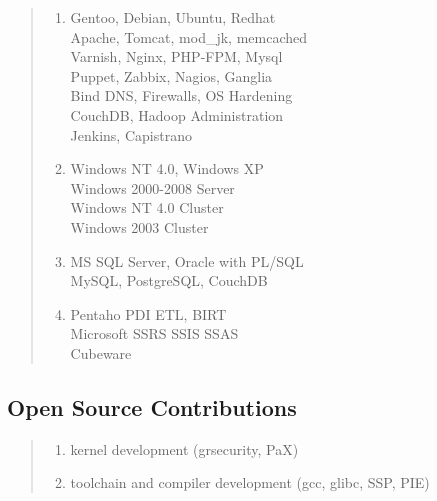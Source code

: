 \documentclass[a4paper]{report}
\begin{document}
\begin{quote}

\begin{enumerate}

\item[\textbf{Linux}]
                  Gentoo, Debian, Ubuntu, Redhat\\
                  Apache, Tomcat, mod\_jk, memcached\\
                  Varnish, Nginx, PHP-FPM, Mysql\\
                  Puppet, Zabbix, Nagios, Ganglia\\
                  Bind DNS, Firewalls, OS Hardening\\
                  CouchDB, Hadoop Administration\\
                  Jenkins, Capistrano

\item[\textbf{Microsoft}]
                  Windows NT 4.0, Windows XP\\
                  Windows 2000-2008 Server\\
                  Windows NT 4.0 Cluster\\
                  Windows 2003 Cluster

\item[\textbf{Databases}]
                  MS SQL Server, Oracle with PL/SQL\\
                  MySQL, PostgreSQL, CouchDB

\item[\textbf{BI}]
                  Pentaho PDI ETL, BIRT\\
                  Microsoft SSRS SSIS SSAS\\
                  Cubeware

\end{enumerate}

\end{quote}

\subsection*{Open Source Contributions}

\begin{quote}

\begin{enumerate}
\item[Parisc-Linux]    kernel development (grsecurity, PaX)
\item[Gentoo Hardened] toolchain and compiler development (gcc, glibc, SSP, PIE)
\end{enumerate}

\end{quote}
\end{document}
